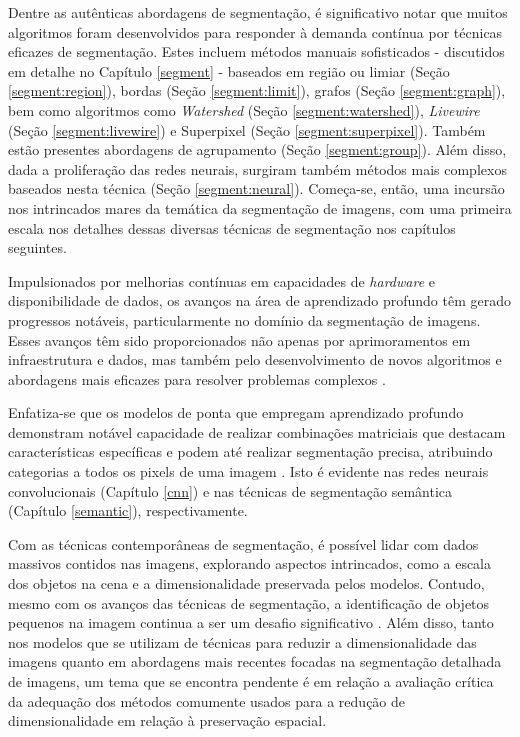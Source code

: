 Dentre as autênticas abordagens de segmentação, é significativo notar que muitos algoritmos foram desenvolvidos para responder à demanda contínua por técnicas eficazes de segmentação. Estes incluem métodos manuais sofisticados - discutidos em detalhe no Capítulo \ref{segment} - baseados em região ou limiar (Seção \ref{segment:region}), bordas (Seção \ref{segment:limit}), grafos (Seção \ref{segment:graph}), bem como algoritmos como \textit{Watershed} (Seção \ref{segment:watershed}), \textit{Livewire} (Seção \ref{segment:livewire}) e Superpixel (Seção \ref{segment:superpixel}). Também estão presentes abordagens de agrupamento (Seção \ref{segment:group}). Além disso, dada a proliferação das redes neurais, surgiram também métodos mais complexos baseados nesta técnica (Seção \ref{segment:neural}). Começa-se, então, uma incursão nos intrincados mares da temática da segmentação de imagens, com uma primeira escala nos detalhes dessas diversas técnicas de segmentação nos capítulos seguintes.

Impulsionados por melhorias contínuas em capacidades de \textit{hardware} e disponibilidade de dados, os avanços na área de aprendizado profundo têm gerado progressos notáveis, particularmente no domínio da segmentação de imagens. Esses avanços têm sido proporcionados não apenas por aprimoramentos em infraestrutura e dados, mas também pelo desenvolvimento de novos algoritmos e abordagens mais eficazes para resolver problemas complexos \citep{Szegedy2015}.

Enfatiza-se que os modelos de ponta que empregam aprendizado profundo demonstram notável capacidade de realizar combinações matriciais que destacam características específicas e podem até realizar segmentação precisa, atribuindo categorias a todos os pixels de uma imagem \citep{Minaee2021}. Isto é evidente nas redes neurais convolucionais (Capítulo \ref{cnn}) e nas técnicas de segmentação semântica (Capítulo \ref{semantic}), respectivamente.

Com as técnicas contemporâneas de segmentação, é possível lidar com dados massivos contidos nas imagens, explorando aspectos intrincados, como a escala dos objetos na cena e a dimensionalidade preservada pelos modelos. Contudo, mesmo com os avanços das técnicas de segmentação, a identificação de objetos pequenos na imagem continua a ser um desafio significativo \citep{Sang2023Small-ObjectAttention, Su2021Small-scaleFusion}. Além disso, tanto nos modelos que se utilizam de técnicas para reduzir a dimensionalidade das imagens quanto em abordagens mais recentes focadas na segmentação detalhada de imagens, um tema que se encontra pendente é em relação a avaliação crítica da adequação dos métodos comumente usados para a redução de dimensionalidade em relação à preservação espacial.

